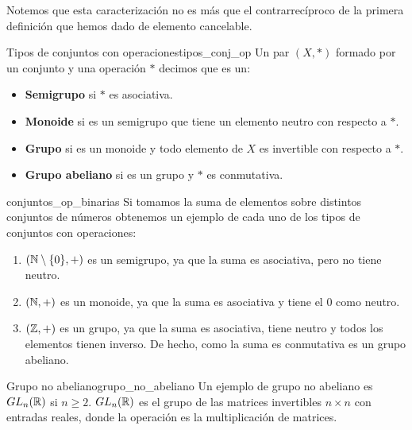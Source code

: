 \begin{remark}
    Notemos que esta caracterización no es más que el contrarrecíproco de la primera definición que hemos dado de elemento cancelable. 
\end{remark}

\begin{definition}{Tipos de conjuntos con operaciones}{tipos_conj_op}
    Un par \((X,*)\) formado por un conjunto y una operación \(*\) decimos que es un:
    \begin{itemize}
        \item \textbf{Semigrupo} si \(*\) es asociativa.
        
        \item \textbf{Monoide} si es un semigrupo que tiene un elemento neutro con respecto a \(*\).
        
        \item \textbf{Grupo} si es un monoide y todo elemento de \(X\) es invertible con respecto a \(*\).
        
        \item \textbf{Grupo abeliano} si es un grupo y \(*\) es conmutativa.
    \end{itemize}
\end{definition}

\begin{example}{}{conjuntos_op_binarias}
    Si tomamos la suma de elementos sobre distintos conjuntos de números obtenemos un ejemplo de cada uno de los tipos de conjuntos con operaciones:
    \begin{enumerate}
        \item $(\mathbb{N} \setminus \{ 0 \},+)$ es un semigrupo, ya que la suma es asociativa, pero no tiene neutro.
        \item $(\mathbb{N},+)$ es un monoide, ya que la suma es asociativa y tiene el 0 como neutro.
        \item $(\mathbb{Z},+)$ es un grupo, ya que la suma es asociativa, tiene neutro y todos los elementos tienen inverso. De hecho, como la suma es conmutativa es un grupo abeliano.
    \end{enumerate}
\end{example}

\begin{example}{Grupo no abeliano}{grupo_no_abeliano}
    Un ejemplo de grupo no abeliano es $GL_n(\mathbb{R})$ si $n \geq 2$. $GL_n(\mathbb{R})$ es el grupo de las matrices invertibles $n\times n$ con entradas reales, donde la operación es la multiplicación de matrices.
\end{example}

